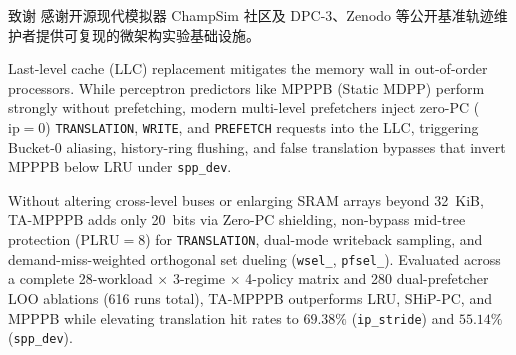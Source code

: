 \documentclass[10.5pt,compsoc,UTF8]{CjC}
\begin{document}
\vspace{4pt}
{\noindent{}\heiti 致\quad 谢}\quad
{\songti 感谢开源现代模拟器 ChampSim 社区及 DPC-3、Zenodo 等公开基准轨迹维护者提供可复现的微架构实验基础设施。}

\vspace{2pt}



\vspace{3pt}
\vspace{1pt}

{\noindent{}
Last-level cache (LLC) replacement mitigates the memory wall in out-of-order processors. While perceptron predictors like MPPPB (Static MDPP) perform strongly without prefetching, modern multi-level prefetchers inject zero-PC ($\mathrm{ip}=0$) \texttt{TRANSLATION}, \texttt{WRITE}, and \texttt{PREFETCH} requests into the LLC, triggering Bucket-0 aliasing, history-ring flushing, and false translation bypasses that invert MPPPB below LRU under \texttt{spp\_dev}.

Without altering cross-level buses or enlarging SRAM arrays beyond 32~KiB, TA-MPPPB adds only 20~bits via Zero-PC shielding, non-bypass mid-tree protection ($\mathrm{PLRU}=8$) for \texttt{TRANSLATION}, dual-mode writeback sampling, and demand-miss-weighted orthogonal set dueling (\texttt{wsel\_}, \texttt{pfsel\_}). Evaluated across a complete 28-workload $\times$ 3-regime $\times$ 4-policy matrix and 280 dual-prefetcher LOO ablations (616 runs total), TA-MPPPB outperforms LRU, SHiP-PC, and MPPPB while elevating translation hit rates to $69.38\%$ (\texttt{ip\_stride}) and $55.14\%$ (\texttt{spp\_dev}).}
\end{document}
